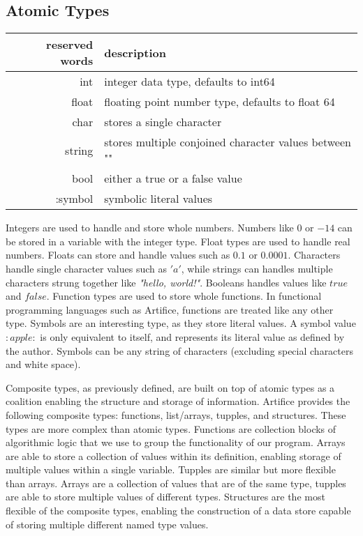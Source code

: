 \documentclass{article}
\begin{document}
\subsection{Atomic Types}
\begin{center}
\begin{tabular}{|r|l|}
	\hline
	reserved words & description \\
	\hline
	\hline
	int & integer data type, defaults to int64 \\
	float & floating point number type, defaults to float 64 \\
	char & stores a single character \\
	string & stores multiple conjoined character values between "" \\
	bool & either a true or a false value \\
	:symbol & symbolic literal values \\
	\hline
\end{tabular}
\end{center}

Integers are used to handle and store whole numbers. Numbers like $0$ or $-14$ can be stored in a variable with the integer type. Float
types are used to handle real numbers. Floats can store and handle values such as $0.1$ or $0.0001$. Characters handle single character
values such as $'a'$, while strings can handles multiple characters strung together like \textit{"hello, world!"}. Booleans handles values like
$true$ and $false$. Function types are used to store whole functions. In functional programming languages such as Artifice, functions are
treated like any other type. Symbols are an interesting type, as they store literal values. A symbol value $:apple:$ is only equivalent
to itself, and represents its literal value as defined by the author. Symbols can be any string of characters (excluding special
characters and white space).

Composite types, as previously defined, are built on top of atomic types as a coalition enabling the structure and storage of
information. Artifice provides the following composite types: functions, list/arrays, tupples, and structures. These types are more complex than
atomic types. Functions are collection blocks of algorithmic logic that we use to group the functionality of our program.
Arrays are able to store a collection of values within its definition, enabling storage of multiple values within a single
variable. Tupples are similar but more flexible than arrays. Arrays are a collection of values that are of the same type, tupples are able
to store multiple values of different types. Structures are the most flexible of the composite types, enabling the construction of a data
store capable of storing multiple different named type values.
\end{document}
